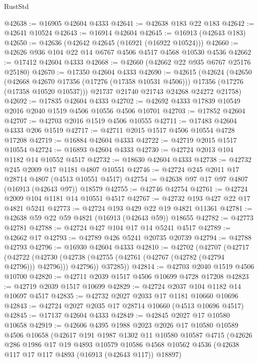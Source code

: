 \begin{lexlean}{RustStd}
\begin{coremodule}
@42638 := @16905 @42604 @4333
@42641 := @42638 @183 @22 @183
@42642 := @42641 @10524
@42643 := @16914 @42604
@42645 := @16913 (@42643 @183)
@42650 := @42636 (@42642 @42645 (@16921 (@16922 @10524)))
@42660 := @42626 @936 @104 @22 @14 @6767 @4506 @4517 @4568 @10530 @4536
@42662 := @17412 @42604 @4333
@42668 := @42660 (@42662 @22 @935 @6767 @25176 @25180)
@42670 := @17350 @42604 @4333
@42690 := @42615
    (@42624
      (@42650
        (@42668 @42670 @17356 (@17276 (@17358 @10531 @4506)))
        @17356
        (@17276 (@17358 @10520 @10537)))
      @21737
      @21740
      @21743
      @24268
      @24272
      @21758)
@42692 := @17835 @42604 @4333
@42702 := @42692 @4333 @17839 @10549 @2016 @2040 @1519 @4506 @10556 @4506 @10701
@42703 := @17852 @42604
@42707 := @42703 @2016 @1519 @4506 @10555
@42711 := @17483 @42604 @4333 @206 @1519
@42717 := @42711 @2015 @1517 @4506 @10554 @4728 @17208
@42719 := @16884 @42604 @4333
@42722 := @42719 @2015 @1517 @10554
@42724 := @16893 @42604 @4333
@42730 := @42724 @2013 @104 @1182 @14 @10552 @4517
@42732 := @18630 @42604 @4333
@42738 := @42732 @245 @2009 @17 @1181 @4807 @10551
@42746 := @42724 @245 @2011 @17 @28714 @4807 (@4513 @10551 @4517)
@42754 := @42638 @97 @17 @97 @4807 (@16913 (@42643 @97)) @18579
@42755 := @42746 @42754
@42761 := @42724 @2009 @104 @1181 @14 @10551 @4517
@42767 := @42732 @193 @427 @22 @17 @4821 @5241
@42773 := @42724 @193 @429 @22 @19 @4821 @11361
@42781 := @42638 @59 @22 @59 @4821 (@16913 (@42643 @59)) @18655
@42782 := @42773 @42781
@42788 := @42724 @427 @104 @17 @14 @5241 @4517
@42789 := @42662 @17
@42793 := @42789 @426 @5241 @20735 @20739
@42794 := @42788 @42793
@42796 := @16930 @42604 @4333
@42810 := @42702
    (@42707
      (@42717
        (@42722 (@42730 (@42738 (@42755 (@42761 (@42767 (@42782 (@42794 @42796))) @42796))) @42796))
        @37285))
@42814 := @42703 @2040 @1519 @4506 @10700
@42820 := @42711 @2039 @1517 @4506 @10699 @4728 @17208
@42823 := @42719 @2039 @1517 @10699
@42829 := @42724 @2037 @104 @1182 @14 @10697 @4517
@42835 := @42732 @2027 @2033 @17 @1181 @10660 @10696
@42843 := @42724 @2027 @2035 @17 @28714 @10660 (@4513 @10696 @4517)
@42845 := @17137 @42604 @4333
@42849 := @42845 @2027 @17 @10580 @10658
@42919 := @42606
    @4395
    @1988
    @2023
    @2026
    @17
    @10580
    @10589
    @4506
    @10658
    (@42617
      @191
      @1987
      @1302
      @11
      @10580
      @10587
      @4715
      (@42626
        @286
        @1986
        @17
        @19
        @4893
        @10579
        @10586
        @4568
        @10562
        @4536
        (@42638 @117 @17 @117 @4893 (@16913 (@42643 @117)) @18897)

\end{coremodule}
\end{lexlean}
